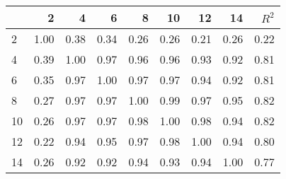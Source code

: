 \begin{tabular}{lrrrrrrrr}
\toprule
{} &     2 &     4 &     6 &     8 &    10 &    12 &    14 &  $R^2$ \\
\midrule
2  &  1.00 &  0.38 &  0.34 &  0.26 &  0.26 &  0.21 &  0.26 &   0.22 \\
4  &  0.39 &  1.00 &  0.97 &  0.96 &  0.96 &  0.93 &  0.92 &   0.81 \\
6  &  0.35 &  0.97 &  1.00 &  0.97 &  0.97 &  0.94 &  0.92 &   0.81 \\
8  &  0.27 &  0.97 &  0.97 &  1.00 &  0.99 &  0.97 &  0.95 &   0.82 \\
10 &  0.26 &  0.97 &  0.97 &  0.98 &  1.00 &  0.98 &  0.94 &   0.82 \\
12 &  0.22 &  0.94 &  0.95 &  0.97 &  0.98 &  1.00 &  0.94 &   0.80 \\
14 &  0.26 &  0.92 &  0.92 &  0.94 &  0.93 &  0.94 &  1.00 &   0.77 \\
\bottomrule
\end{tabular}
